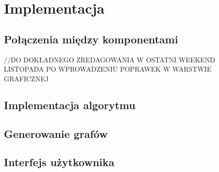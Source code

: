 \chapter{Implementacja}
\thispagestyle{chapterBeginStyle}

\section{Połączenia między komponentami}
    //DO DOKŁADNEGO ZREDAGOWANIA W OSTATNI WEEKEND LISTOPADA PO WPROWADZENIU POPRAWEK W WARSTWIE GRAFICZNEJ
\section{Implementacja algorytmu}

\section{Generowanie grafów}

\section{Interfejs użytkownika}
